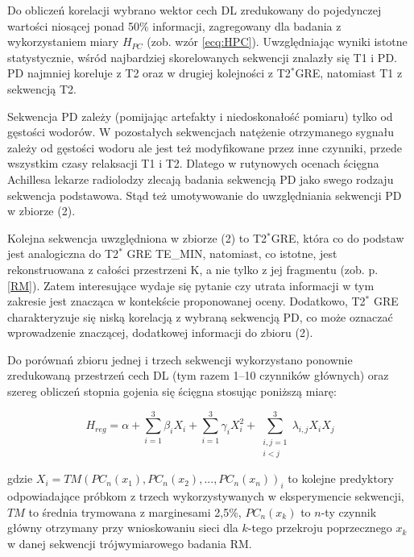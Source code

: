 Do obliczeń korelacji wybrano wektor cech DL zredukowany do pojedynczej wartości niosącej ponad 50\% informacji, zagregowany dla badania z wykorzystaniem miary $H_{PC}$ (zob. wzór \ref{ecq:HPC}). Uwzględniając wyniki istotne statystycznie, wśród najbardziej skorelowanych sekwencji znalazły się T1 i PD. PD najmniej koreluje \linebreak z T2 oraz w drugiej kolejności z T2$^\ast$GRE, natomiast T1 z sekwencją T2. 

Sekwencja PD zależy (pomijając artefakty i niedoskonałość pomiaru) tylko od gęstości wodorów. W pozostałych sekwencjach natężenie otrzymanego sygnału zależy od gęstości wodoru ale jest też modyfikowane przez inne czynniki, przede wszystkim czasy relaksacji T1 i T2. Dlatego w rutynowych ocenach ścięgna Achillesa lekarze radiolodzy zlecają badania sekwencją PD jako swego rodzaju sekwencja podstawowa. Stąd też umotywowanie do uwzględniania sekwencji PD w zbiorze (2).

Kolejna sekwencja uwzględniona w zbiorze (2) to T2$^\ast$GRE, która co do podstaw jest analogiczna do T2$^\ast$ GRE TE\_MIN, natomiast, co istotne, jest rekonstruowana z całości przestrzeni K, a nie tylko z jej fragmentu (zob. p. \ref{RM}). Zatem interesujące wydaje się pytanie czy utrata informacji w tym zakresie jest znacząca w kontekście proponowanej oceny. Dodatkowo, T2$^\ast$ GRE charakteryzuje się niską korelacją z wybraną sekwencją PD, co może oznaczać wprowadzenie znaczącej, dodatkowej informacji do zbioru (2).   

Do porównań zbioru jednej i trzech sekwencji wykorzystano ponownie zredukowaną przestrzeń cech DL (tym razem 1--10 czynników głównych) oraz szereg obliczeń stopnia gojenia się ścięgna stosując poniższą miarę: 

\begin{equation}
H_{reg} = \alpha + \sum_{i=1}^{3}\beta_{i}X_{i} + \sum_{i=1}^{3}\gamma_{i}X_{i}^{2} +
\sum_{\substack{i, j = 1\\ i < j}}^{3}\lambda_{i,j}X_{i}X_{j}
\end{equation}

gdzie $X_i = TM(PC_n(x_1), PC_n(x_2),..., PC_n(x_n))_{i}$ to kolejne predyktory odpowiadające próbkom z trzech wykorzystywanych w eksperymencie sekwencji, $TM$ \linebreak to średnia trymowana z marginesami 2,5\%, $PC_n(x_k)$ to $n$-ty czynnik główny otrzymany przy wnioskowaniu sieci dla $k$-tego przekroju poprzecznego $x_k$ w danej sekwencji trójwymiarowego badania RM.

